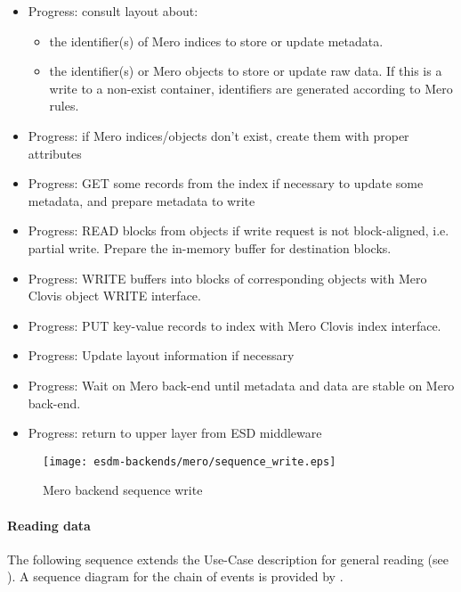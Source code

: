 \begin{itemize}
	\item Progress: consult layout about:
	\begin{itemize}
		\item the identifier(s) of Mero indices to store or update metadata.
		\item the identifier(s) or Mero objects to store or update raw data. %
		      If this is a write to a non-exist container, identifiers are generated
		      according to Mero rules.
	\end{itemize}
	\item Progress: if Mero indices/objects don't exist, create them with proper attributes
	\item Progress: GET some records from the index if necessary to update some metadata, %
			and prepare metadata to write
	\item Progress: READ blocks from objects if write request is not block-aligned, %
			i.e. partial write. Prepare the in-memory buffer for destination blocks.
	\item Progress: WRITE buffers into blocks of corresponding objects with Mero %
			Clovis object WRITE interface.
	\item Progress: PUT key-value records to index with Mero Clovis index interface.
	\item Progress: Update layout information if necessary
	\item Progress: Wait on Mero back-end until metadata and data are stable on Mero back-end.
	\item Progress: return to upper layer from ESD middleware
\end{itemize}

\begin{figure}
	\centering
	\texttt{[image: esdm-backends/mero/sequence\_write.eps]}
	\caption{Mero backend sequence write}
	\label{fig:mero backend sequence write}
\end{figure}


\paragraph{Reading data}

The following sequence extends the Use-Case description for general reading
(see ).
A sequence diagram for the chain of events is provided by .

